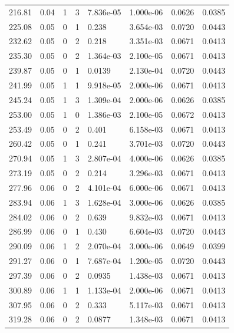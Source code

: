 \documentclass[preview]{standalone}
\begin{document}
{{{\begin{tabular}{L{1.2cm}C{1.2cm} C{0.3cm}C{0.5cm} C{1.4cm}C{1.4cm} C{1.4cm}C{1.4cm}}
  216.81  &  0.04  & 1     &  3 &  7.836e-05  & 1.000e-06  & 0.0626 &  0.0385   \\ 
  225.08  &  0.05  & 0     &  1 &  0.238  & 3.654e-03  & 0.0720 &  0.0443   \\ 
  232.62  &  0.05  & 0     &  2 &  0.218  & 3.351e-03  & 0.0671 &  0.0413   \\ 
  235.30  &  0.05  & 0     &  2 &  1.364e-03  & 2.100e-05  & 0.0671 &  0.0413   \\ 
  239.87  &  0.05  & 0     &  1 &  0.0139  & 2.130e-04  & 0.0720 &  0.0443   \\ 
  241.99  &  0.05  & 1     &  1 &  9.918e-05  & 2.000e-06  & 0.0671 &  0.0413   \\ 
  245.24  &  0.05  & 1     &  3 &  1.309e-04  & 2.000e-06  & 0.0626 &  0.0385   \\ 
  253.00  &  0.05  & 1     &  0 &  1.386e-03  & 2.100e-05  & 0.0672 &  0.0413   \\ 
  253.49  &  0.05  & 0     &  2 &  0.401  & 6.158e-03  & 0.0671 &  0.0413   \\ 
  260.42  &  0.05  & 0     &  1 &  0.241  & 3.701e-03  & 0.0720 &  0.0443   \\ 
  270.94  &  0.05  & 1     &  3 &  2.807e-04  & 4.000e-06  & 0.0626 &  0.0385   \\ 
  273.19  &  0.05  & 0     &  2 &  0.214  & 3.296e-03  & 0.0671 &  0.0413   \\ 
  277.96  &  0.06  & 0     &  2 &  4.101e-04  & 6.000e-06  & 0.0671 &  0.0413   \\ 
  283.94  &  0.06  & 1     &  3 &  1.628e-04  & 3.000e-06  & 0.0626 &  0.0385   \\ 
  284.02  &  0.06  & 0     &  2 &  0.639  & 9.832e-03  & 0.0671 &  0.0413   \\ 
  286.99  &  0.06  & 0     &  1 &  0.430  & 6.604e-03  & 0.0720 &  0.0443   \\ 
  290.09  &  0.06  & 1     &  2 &  2.070e-04  & 3.000e-06  & 0.0649 &  0.0399   \\ 
  291.27  &  0.06  & 0     &  1 &  7.687e-04  & 1.200e-05  & 0.0720 &  0.0443   \\ 
  297.39  &  0.06  & 0     &  2 &  0.0935  & 1.438e-03  & 0.0671 &  0.0413   \\ 
  300.89  &  0.06  & 1     &  1 &  1.133e-04  & 2.000e-06  & 0.0671 &  0.0413   \\ 
  307.95  &  0.06  & 0     &  2 &  0.333  & 5.117e-03  & 0.0671 &  0.0413   \\ 
  319.28  &  0.06  & 0     &  2 &  0.0877  & 1.348e-03  & 0.0671 &  0.0413   \\ 

\end{tabular}}}}
\end{document}
